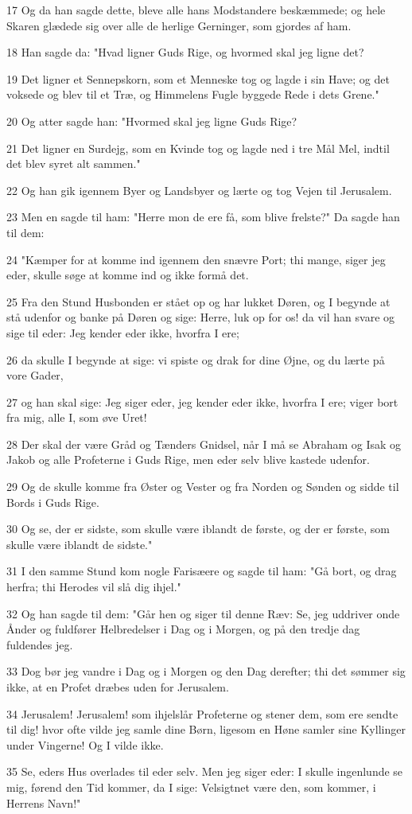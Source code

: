 \par 17 Og da han sagde dette, bleve alle hans Modstandere beskæmmede; og hele Skaren glædede sig over alle de herlige Gerninger, som gjordes af ham.
\par 18 Han sagde da: "Hvad ligner Guds Rige, og hvormed skal jeg ligne det?
\par 19 Det ligner et Sennepskorn, som et Menneske tog og lagde i sin Have; og det voksede og blev til et Træ, og Himmelens Fugle byggede Rede i dets Grene."
\par 20 Og atter sagde han: "Hvormed skal jeg ligne Guds Rige?
\par 21 Det ligner en Surdejg, som en Kvinde tog og lagde ned i tre Mål Mel, indtil det blev syret alt sammen."
\par 22 Og han gik igennem Byer og Landsbyer og lærte og tog Vejen til Jerusalem.
\par 23 Men en sagde til ham: "Herre mon de ere få, som blive frelste?" Da sagde han til dem:
\par 24 "Kæmper for at komme ind igennem den snævre Port; thi mange, siger jeg eder, skulle søge at komme ind og ikke formå det.
\par 25 Fra den Stund Husbonden er stået op og har lukket Døren, og I begynde at stå udenfor og banke på Døren og sige: Herre, luk op for os! da vil han svare og sige til eder: Jeg kender eder ikke, hvorfra I ere;
\par 26 da skulle I begynde at sige: vi spiste og drak for dine Øjne, og du lærte på vore Gader,
\par 27 og han skal sige: Jeg siger eder, jeg kender eder ikke, hvorfra I ere; viger bort fra mig, alle I, som øve Uret!
\par 28 Der skal der være Gråd og Tænders Gnidsel, når I må se Abraham og Isak og Jakob og alle Profeterne i Guds Rige, men eder selv blive kastede udenfor.
\par 29 Og de skulle komme fra Øster og Vester og fra Norden og Sønden og sidde til Bords i Guds Rige.
\par 30 Og se, der er sidste, som skulle være iblandt de første, og der er første, som skulle være iblandt de sidste."
\par 31 I den samme Stund kom nogle Farisæere og sagde til ham: "Gå bort, og drag herfra; thi Herodes vil slå dig ihjel."
\par 32 Og han sagde til dem: "Går hen og siger til denne Ræv: Se, jeg uddriver onde Ånder og fuldfører Helbredelser i Dag og i Morgen, og på den tredje dag fuldendes jeg.
\par 33 Dog bør jeg vandre i Dag og i Morgen og den Dag derefter; thi det sømmer sig ikke, at en Profet dræbes uden for Jerusalem.
\par 34 Jerusalem! Jerusalem! som ihjelslår Profeterne og stener dem, som ere sendte til dig! hvor ofte vilde jeg samle dine Børn, ligesom en Høne samler sine Kyllinger under Vingerne! Og I vilde ikke.
\par 35 Se, eders Hus overlades til eder selv. Men jeg siger eder: I skulle ingenlunde se mig, førend den Tid kommer, da I sige: Velsigtnet være den, som kommer, i Herrens Navn!"


